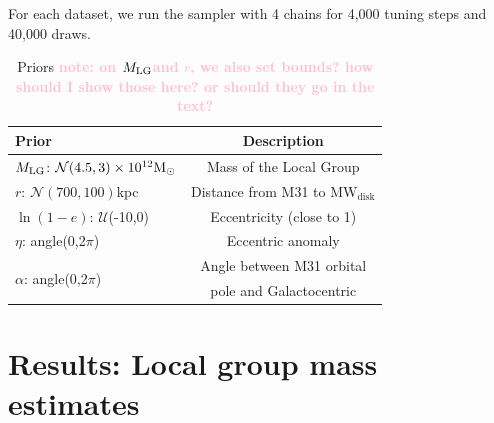 \documentclass[twocolumn]{aastex631}
\newcommand{\kc}[1]{\textcolor{pink}{\textbf{#1}} }
\newcommand{\mlg}{\ensuremath{M_{\rm LG}}}
\newcommand{\mwdisk}{\ensuremath{\textrm{MW}_\textrm{disk}}}
\begin{document}
For each dataset, we run the sampler with 4 chains for 4,000 tuning steps and
40,000 draws.


\begin{table}
  \centering
  \begin{tabular}{lc}
  \hline\hline
  Prior  & Description \\\hline
  \mlg: $\mathcal{N}(4.5,3)\times10^{12}\mathrm{M}_\odot$ & Mass of the Local Group\\
  $r$: $\mathcal{N}(700,100)$kpc & Distance from M31 to $\mwdisk$\\
  $\ln(1-e)$: $\mathcal{U}$(-10,0) & Eccentricity (close to 1) \\
  $\eta$: angle(0,2$\pi$)& Eccentric anomaly\\
  \multirow{2}{*}{$\alpha$: angle(0,2$\pi$)} & Angle between M31 orbital\\
  & pole and Galactocentric\\
  \hline\hline
  \end{tabular}
  \caption{\label{table:priors}Priors \kc{note: on \mlg and $r$, we also set bounds? how should I show those here? or should they go in the text?}}
\end{table}


\section{Results: Local group mass estimates}
\label{sec:results}
\end{document}
